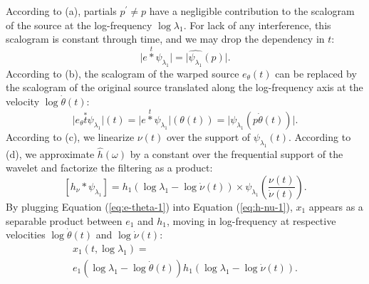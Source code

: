 \documentclass[twoside,a4paper]{article}
\begin{document}
According to (a), partials $p^{\prime} \neq p$ have a negligible contribution to the scalogram of the source at the log-frequency $\log \lambda_1$. For lack of any interference, this scalogram is constant through time, and we may drop the dependency in $t$:
\begin{equation}
\vert e \overset{t}{\ast} \psi_{\lambda_1} \vert =
\vert \widehat{\psi_{\lambda_1}}(p) \vert.
\end{equation}
According to (b), the scalogram of the warped source $e_\theta (t)$ can be replaced by the scalogram of the original source translated along the log-frequency axis at the velocity $\log \dot{\theta}(t)$:
\begin{equation}
\vert e_{\theta} \overset{\ast}{t} \psi_{\lambda_1} \vert (t) =
\vert e \overset{t}{\ast} \psi_{\lambda_1} \vert (\theta(t)) =
\vert \widehat{\psi_{\lambda_1}}(p \dot{\theta}(t)) \vert.
\label{eq:e-theta-1}
\end{equation}
According to (c), we linearize $\nu(t)$ over the support of $\psi_{\lambda_1}(t)$.
According to (d), we approximate $\hat{h}(\omega)$ by a constant over the frequential support of the wavelet and factorize the filtering as a product:
\begin{equation}
\left[ h_\nu \ast \psi_{\lambda_1} \right] =
h_{1}(\log \lambda_1 - \log \dot{\nu}(t)) \times
\psi_{\lambda_1}\left( \frac{\nu(t)}{\dot{\nu}(t)} \right).
\label{eq:h-nu-1}
\end{equation}
By plugging Equation (\ref{eq:e-theta-1}) into Equation (\ref{eq:h-nu-1}), $x_1$ appears as a separable product between $e_1$ and $h_1$, moving in log-frequency at respective velocities $\log \dot{\theta}(t)$ and $\log \dot{\nu}(t)$:
\begin{multline}
x_1(t,\log \lambda_1) = \\
e_{1}(\log \lambda_1 - \log \dot{\theta}(t))
h_{1}(\log \lambda_1 - \log \dot{\nu}(t)).
\label{eq:factorization}
\end{multline}
\end{document}
